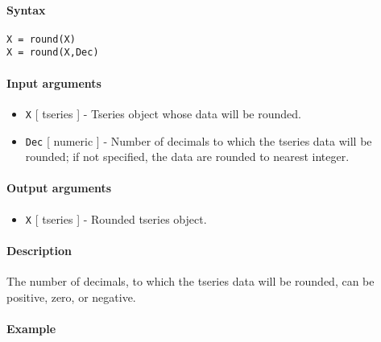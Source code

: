 


	\paragraph{Syntax}\label{syntax}

\begin{verbatim}
X = round(X)
X = round(X,Dec)
\end{verbatim}

\paragraph{Input arguments}\label{input-arguments}

\begin{itemize}
\item
  \texttt{X} {[} tseries {]} - Tseries object whose data will be
  rounded.
\item
  \texttt{Dec} {[} numeric {]} - Number of decimals to which the tseries
  data will be rounded; if not specified, the data are rounded to
  nearest integer.
\end{itemize}

\paragraph{Output arguments}\label{output-arguments}

\begin{itemize}
\itemsep1pt\parskip0pt
\item
  \texttt{X} {[} tseries {]} - Rounded tseries object.
\end{itemize}

\paragraph{Description}\label{description}

The number of decimals, to which the tseries data will be rounded, can
be positive, zero, or negative.

\paragraph{Example}\label{example}


